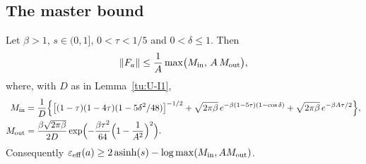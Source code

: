 \subsection{The master bound}

\begin{theorem}\label{tu:U-F-master}
Let $\beta>1$, $s\in(0,1]$, $0<\tau<1/5$ and $0<\delta\le1$. Then
\[
\|F_a\|\le\frac1A\max\bigl(M_{\rm in},\,A\,M_{\rm out}\bigr),
\]
where, with $D$ as in Lemma~\ref{tu:U-I1},
\begin{align*}
M_{\rm in}&=\frac1D\Bigl\{\bigl[(1-\tau)(1-4\tau)(1-5\delta^2/48)\bigr]^{-1/2}+\sqrt{2\pi\beta}\,e^{-\beta(1-5\tau)(1-\cos\delta)}+\sqrt{2\pi\beta}\,e^{-\beta A\tau/2}\Bigr\},\\
M_{\rm out}&=\frac{\beta\sqrt{2\pi\beta}}{2D}\exp\Bigl(-\frac{\beta\tau^2}{64}\Bigl(1-\frac1{A^2}\Bigr)^2\Bigr).
\end{align*}
Consequently $\varepsilon_{\mathrm{eff}}(a)\ge2\operatorname{asinh}(s)-\log\max(M_{\rm in},AM_{\rm out})$.
\end{theorem}

